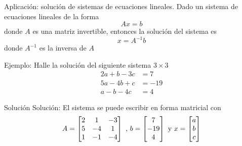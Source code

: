 \documentclass[
  ignorenonframetext,
  aspectratio=169,
  spanish,
]{beamer}
\begin{document}
\begin{frame}{Aplicación: solución de sistemas de ecuaciones lineales.}
\label{aplicaciuxf3n-soluciuxf3n-de-sistemas-de-ecuaciones-lineales.}
Dado un sistema de ecuaciones lineales de la forma \[Ax=b\] donde \(A\)
es una matriz invertible, entonces la solución del sistema es
\[x=A^{-1}b\] donde \(A^{-1}\) es la inversa de \(A\)
\end{frame}

\begin{frame}{}
\label{section-1}
Ejemplo: Halle la solución del siguiente sistema \(3\times 3\)
\[\begin{array}{rl}
2a+b-3c &= 7\\
5a-4b+c&=-19\\
a-b-4c&=4
\end{array}\]
\end{frame}

\begin{frame}{Solución}
\label{soluciuxf3n}
Solución: El sistema se puede escribir en forma matricial con
\[ A=\begin{bmatrix}
2 & 1  & -3 \\
5 & -4 & 1  \\
1 & -1 & -4
\end{bmatrix} \hbox{ ,  } b=\begin{bmatrix}
7  \\
-19   \\
4 
\end{bmatrix} \hbox{ y   }x=\begin{bmatrix}
a \\
b  \\
c 
\end{bmatrix} \]
\end{frame}
\end{document}
